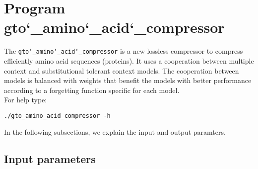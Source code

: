 \section{Program gto\char`_amino\char`_acid\char`_compressor}
The \texttt{gto\char`_amino\char`_acid\char`_compressor} is a new lossless compressor to compress efficiently amino acid sequences (proteins). It uses a cooperation between multiple context and substitutional tolerant context models. The cooperation between models is balanced with weights that benefit the models with better performance according to a forgetting function specific for each model.\\
For help type:
\begin{lstlisting}
./gto_amino_acid_compressor -h
\end{lstlisting}
In the following subsections, we explain the input and output paramters.

\subsection*{Input parameters}

